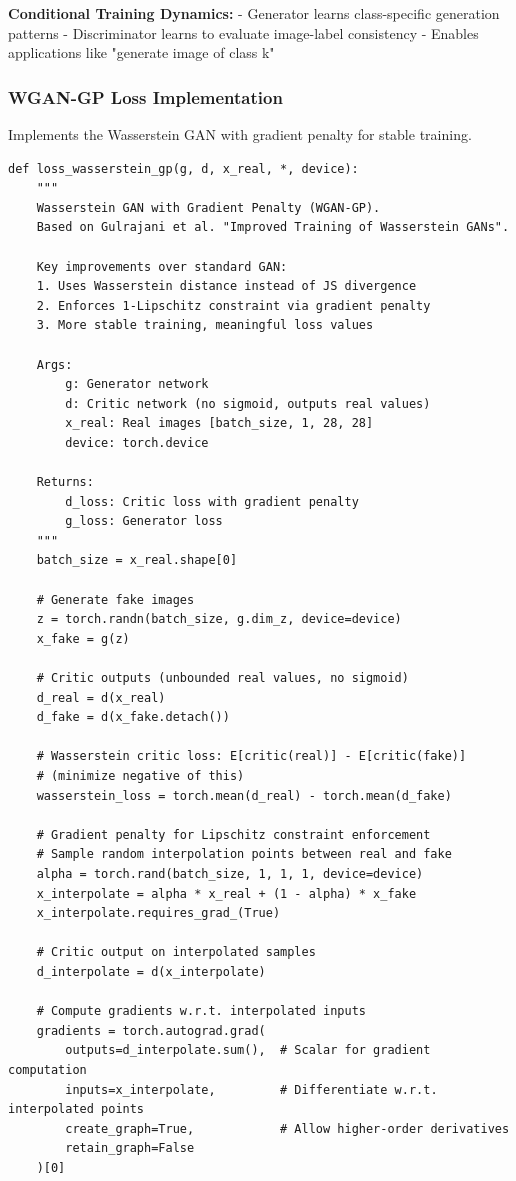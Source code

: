 \documentclass{article}
\begin{document}
\textbf{Conditional Training Dynamics:}
- Generator learns class-specific generation patterns
- Discriminator learns to evaluate image-label consistency
- Enables applications like "generate image of class k"

\subsubsection{WGAN-GP Loss Implementation}

Implements the Wasserstein GAN with gradient penalty for stable training.

\begin{verbatim}
def loss_wasserstein_gp(g, d, x_real, *, device):
    """
    Wasserstein GAN with Gradient Penalty (WGAN-GP).
    Based on Gulrajani et al. "Improved Training of Wasserstein GANs".

    Key improvements over standard GAN:
    1. Uses Wasserstein distance instead of JS divergence
    2. Enforces 1-Lipschitz constraint via gradient penalty
    3. More stable training, meaningful loss values

    Args:
        g: Generator network
        d: Critic network (no sigmoid, outputs real values)
        x_real: Real images [batch_size, 1, 28, 28]
        device: torch.device

    Returns:
        d_loss: Critic loss with gradient penalty
        g_loss: Generator loss
    """
    batch_size = x_real.shape[0]

    # Generate fake images
    z = torch.randn(batch_size, g.dim_z, device=device)
    x_fake = g(z)

    # Critic outputs (unbounded real values, no sigmoid)
    d_real = d(x_real)
    d_fake = d(x_fake.detach())

    # Wasserstein critic loss: E[critic(real)] - E[critic(fake)]
    # (minimize negative of this)
    wasserstein_loss = torch.mean(d_real) - torch.mean(d_fake)

    # Gradient penalty for Lipschitz constraint enforcement
    # Sample random interpolation points between real and fake
    alpha = torch.rand(batch_size, 1, 1, 1, device=device)
    x_interpolate = alpha * x_real + (1 - alpha) * x_fake
    x_interpolate.requires_grad_(True)

    # Critic output on interpolated samples
    d_interpolate = d(x_interpolate)

    # Compute gradients w.r.t. interpolated inputs
    gradients = torch.autograd.grad(
        outputs=d_interpolate.sum(),  # Scalar for gradient computation
        inputs=x_interpolate,         # Differentiate w.r.t. interpolated points
        create_graph=True,            # Allow higher-order derivatives
        retain_graph=False
    )[0]


\end{verbatim}
\end{document}
